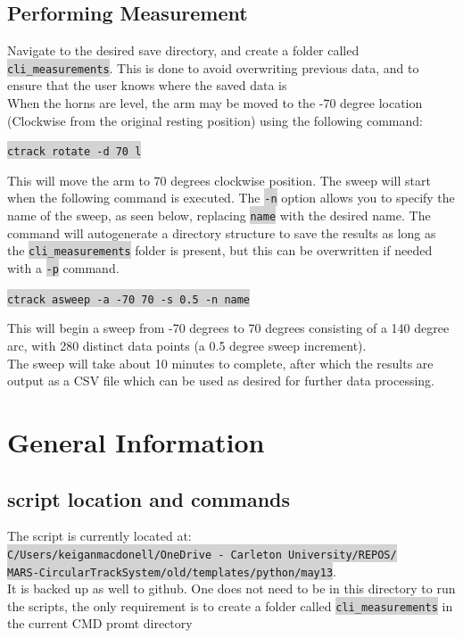 \documentclass[hidelinks]{article}
\newcommand{\code}[1]{\colorbox{lightgray}{\texttt{#1}}}
\begin{document}
\subsection{Performing Measurement}
Navigate to the desired save directory, and create a folder called \code{cli\_measurements}. This is done to avoid overwriting previous data, and to ensure that the user knows where the saved data is \\
When the horns are level, the arm may be moved to the -70 degree location (Clockwise from the original resting position) using the following command:
\begin{center}
    \code{ctrack rotate -d 70 l}
\end{center}
This will move the arm to 70 degrees clockwise position. The sweep will start when the following command is executed. The 
\code{-n} option allows you to specify the name of the sweep, as seen below, replacing \code{name} with the desired name. The command will autogenerate a directory structure to save the results as long as the \code{cli\_measurements} folder is present, but this can be overwritten if needed with a \code{-p} command.
\begin{center}
    \code{ctrack asweep -a -70 70 -s 0.5 -n name}
\end{center}
This will begin a sweep from -70 degrees to 70 degrees consisting of a 140 degree arc, with 280 distinct data points (a 0.5 degree sweep increment).\\
The sweep will take about 10 minutes to complete, after which the results are output as a CSV file which can be used as desired for further data processing.
\clearpage
\section{General Information}
\subsection{script location and commands}
The script is currently located at:\\ \code{C/Users/keiganmacdonell/OneDrive - Carleton University/REPOS/}\\\code{MARS-CircularTrackSystem/old/templates/python/may13}. \\
It is backed up as well to github. One does not need to be in this directory to run the scripts, the only requirement is to create a folder called \code{cli\_measurements} in the current CMD promt directory\\
\end{document}
